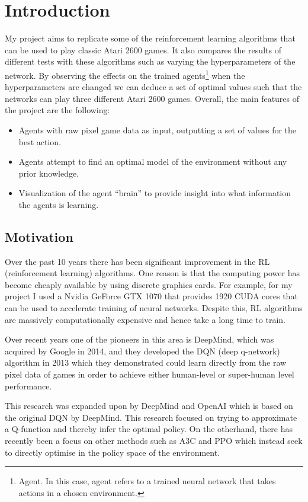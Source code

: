 \chapter{Introduction}
\label{cha:intro}
My project aims to replicate some of the reinforcement learning algorithms that can be used to play classic Atari 2600 games. It also compares the results of different tests with these algorithms such as varying the hyperparameters of the network. By observing the effects on the trained agents\footnote{Agent. In this case, agent refers to a trained neural network that takes actions in a chosen environment.} when the hyperparameters are changed we can deduce a set of optimal values such that the networks can play three different Atari 2600 games. Overall, the main features of the project are the following:
\begin{itemize}
	\item Agents with raw pixel game data as input, outputting a set of values for the best action.
	\item Agents attempt to find an optimal model of the environment without any prior knowledge.
	\item Visualization of the agent ``brain'' to provide insight into what information the agents is learning.
\end{itemize}

\section{Motivation}
\label{intro:sec:moti}
Over the past 10 years there has been significant improvement in the RL (reinforcement learning) algorithms. One reason is that the computing power has become cheaply available by using discrete graphics cards. For example, for my project I used a Nvidia GeForce GTX 1070 that provides 1920 CUDA cores that can be used to accelerate training of neural networks. Despite this, RL algorithms are massively computationally expensive and hence take a long time to train.

Over recent years one of the pioneers in this area is DeepMind, which was acquired by Google in 2014, and they developed the DQN (deep q-network) algorithm in 2013 which they demonstrated could learn directly from the raw pixel data of games in order to achieve either human-level or super-human level performance.

This research was expanded upon by DeepMind and OpenAI which is based on the original DQN by DeepMind. This research focused on trying to approximate a Q-function and thereby infer the optimal policy. On the otherhand, there has recently been a focus on other methods such as A3C and PPO which instead seek to directly optimise in the policy space of the environment.


